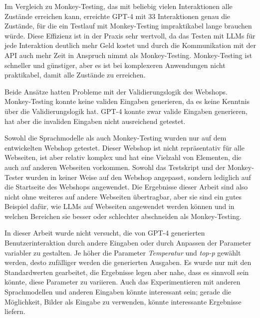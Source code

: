 Im Vergleich zu Monkey-Testing, das mit beliebig vielen Interaktionen alle Zustände erreichen kann, erreichte GPT-4 mit 33 Interaktionen genau die Zustände, für die ein Testlauf mit Monkey-Testing impraktikabel lange brauchen würde.
Diese Effizienz ist in der Praxis sehr wertvoll, da das Testen mit LLMs für jede Interaktion deutlich mehr Geld kostet und durch die Kommunikation mit der API auch mehr Zeit in Anspruch nimmt als Monkey-Testing.
Monkey-Testing ist schneller und günstiger, aber es ist bei komplexeren Anwendungen nicht praktikabel, damit alle Zustände zu erreichen.

Beide Ansätze hatten Probleme mit der Validierungslogik des Webshops.
Monkey-Testing konnte keine validen Eingaben generieren, da es keine Kenntnis über die Validierungslogik hat.
GPT-4 konnte zwar valide Eingaben generieren, hat aber die invaliden Eingaben nicht ausreichend getestet.

Sowohl die Sprachmodelle als auch Monkey-Testing wurden nur auf dem entwickelten Webshop getestet.
Dieser Webshop ist nicht repräsentativ für alle Webseiten, ist  aber relativ komplex und hat eine Vielzahl von Elementen, die auch auf anderen Webseiten vorkommen.
Sowohl das Testskript und der Monkey-Tester wurden in keiner Weise auf den Webshop angepasst, sondern lediglich auf die Startseite des Webshops angewendet.
Die Ergebnisse dieser Arbeit sind also nicht ohne weiteres auf andere Webseiten übertragbar, aber sie sind ein gutes Beispiel dafür, wie LLMs auf Webseiten angewendet werden können und in welchen Bereichen sie besser oder schlechter abschneiden als Monkey-Testing.

In dieser Arbeit wurde nicht versucht, die von GPT-4 generierten Benutzerinteraktion durch andere Eingaben oder durch Anpassen der Parameter variabler zu gestalten.
Je höher die Parameter \textit{Temperatur} und \textit{top-p} gewählt werden, desto zufälliger werden die generierten Ausgaben.
Es wurde nur mit den Standardwerten gearbeitet, die Ergebnisse legen aber nahe, dass es sinnvoll sein könnte, diese Parameter zu variieren.
Auch das Experimentieren mit anderen Sprachmodellen und anderen Eingaben könnte interessant sein; gerade die Möglichkeit, Bilder als Eingabe zu verwenden, könnte interessante Ergebnisse liefern.
